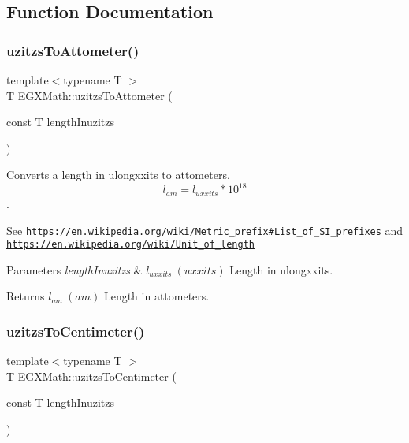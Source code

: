 \subsection{Function Documentation}
\mbox{\label{group___e_g_x_math-_conversions-_length_conversions-_non-_s_i-uzitzs-_s_i_ga33c3f00e9fadcd52f2c0bfbd71a33d2b}} 
\subsubsection{\texorpdfstring{uzitzs\+To\+Attometer()}{uzitzsToAttometer()}}
{\footnotesize\ttfamily template$<$typename T $>$ \\
T E\+G\+X\+Math\+::uzitzs\+To\+Attometer (\begin{DoxyParamCaption}\item[{const T}]{length\+Inuzitzs }\end{DoxyParamCaption})}



Converts a length in ulongxxits to attometers. \[ l_{am}=l_{uxxits} * 10^{18} \]. 

See \href{https://en.wikipedia.org/wiki/Metric_prefix#List_of_SI_prefixes}{\tt https\+://en.\+wikipedia.\+org/wiki/\+Metric\+\_\+prefix\#\+List\+\_\+of\+\_\+\+S\+I\+\_\+prefixes} and \href{https://en.wikipedia.org/wiki/Unit_of_length}{\tt https\+://en.\+wikipedia.\+org/wiki/\+Unit\+\_\+of\+\_\+length} 
\begin{DoxyParams}{Parameters}
{\em length\+Inuzitzs} & $ l_{uxxits}\ (uxxits)$ Length in ulongxxits. \\
\hline
\end{DoxyParams}
\begin{DoxyReturn}{Returns}
$ l_{am}\ (am)$ Length in attometers. 
\end{DoxyReturn}
\mbox{\label{group___e_g_x_math-_conversions-_length_conversions-_non-_s_i-uzitzs-_s_i_ga1fb15b72a000d43348190004a49ed7bc}} 
\subsubsection{\texorpdfstring{uzitzs\+To\+Centimeter()}{uzitzsToCentimeter()}}
{\footnotesize\ttfamily template$<$typename T $>$ \\
T E\+G\+X\+Math\+::uzitzs\+To\+Centimeter (\begin{DoxyParamCaption}\item[{const T}]{length\+Inuzitzs }\end{DoxyParamCaption})}



